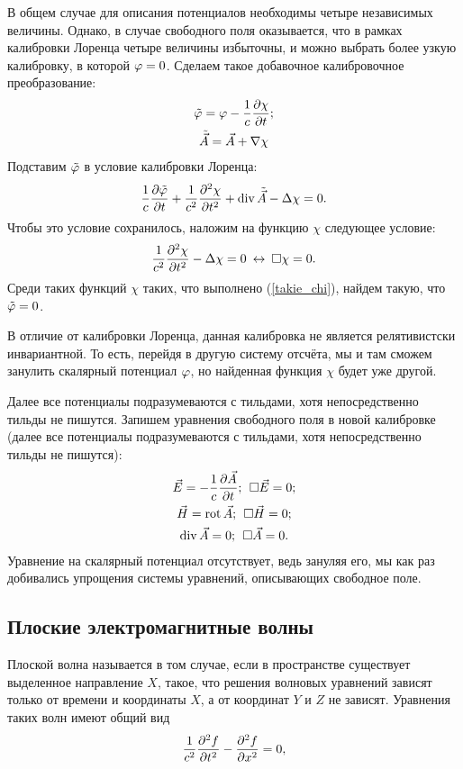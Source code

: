     В общем случае для описания потенциалов необходимы четыре независимых величины. Однако, в случае свободного поля оказывается,
    что в рамках калибровки Лоренца четыре величины избыточны, и можно выбрать более узкую калибровку, в которой $\varphi = 0$.
    Сделаем такое добавочное калибровочное преобразование:
    \begin{gather*}
        \tilde{\varphi} = \varphi - \frac 1c \frac{\partial\chi}{\partial t};\\
        \tilde{\vec{A}} = \vec{A} + \nabla\chi
    \end{gather*}
    Подставим $\tilde{\varphi}$ в условие калибровки Лоренца:
    \[
        \frac 1c \frac{\partial\tilde{\varphi}}{\partial t} + \frac 1{c^2}\frac{\partial^2\chi}{\partial{t}^2} + \operatorname{div}\tilde{\vec{A}} - \Delta\chi = 0.
    \]
    Чтобы это условие сохранилось, наложим на функцию $\chi$ следующее условие:
    \begin{equation}
        \frac 1{c^2} \frac{\partial^2\chi}{\partial{t}^2} - \Delta \chi = 0 \: \leftrightarrow \: \Box\chi = 0. \label{takie_chi}
    \end{equation}
    Среди таких функций $\chi$ таких, что выполнено (\ref{takie_chi}), найдем такую, что $\tilde{\varphi} = 0$.
    \begin{note}
        В отличие от калибровки Лоренца, данная калибровка не является релятивистски инвариантной. То есть, перейдя в другую систему отсчёта,
        мы и там сможем занулить скалярный потенциал $\varphi$, но найденная функция $\chi$ будет уже другой.
    \end{note}
    Далее все потенциалы подразумеваются с тильдами, хотя непосредственно тильды не пишутся.
    Запишем уравнения свободного поля в новой калибровке (далее все потенциалы подразумеваются с тильдами, хотя непосредственно тильды не пишутся):
    \begin{gather*}
        \vec{E} = -\frac{1}{c} \frac{\partial\vec{A}}{\partial t}; \:\: \Box\vec{E} = 0;\\
        \vec{H} = \operatorname{rot}\vec{A}; \:\: \Box\vec{H} = 0;\\
        \operatorname{div}\vec{A} = 0; \:\: \Box\vec{A} = 0.
    \end{gather*}
    Уравнение на скалярный потенциал отсутствует, ведь зануляя его, мы как раз добивались упрощения системы уравнений,
    описывающих свободное поле.

\subsection{Плоские электромагнитные волны}
    Плоской волна называется в том случае, если в пространстве существует выделенное направление $X$, такое, что решения
    волновых уравнений зависят только от времени и координаты $X$, а от координат $Y$ и $Z$ не зависят. Уравнения таких волн имеют
    общий вид
    \begin{equation}
        \frac 1{c^2} \frac{\partial^2f}{\partial{t}^2} - \frac{\partial^2f}{\partial{x}^2} = 0, \label{wave_eq}
    \end{equation}

